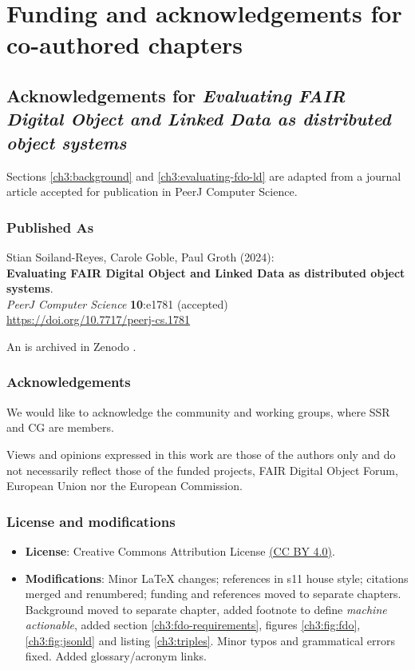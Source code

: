 \section{Funding and acknowledgements for co-authored chapters}


\subsection{Acknowledgements for \textit{Evaluating FAIR Digital Object and Linked Data as distributed object systems}}\label{ch11:fdo}

Sections \vref{ch3:background} and \vref{ch3:evaluating-fdo-ld} are adapted from a journal article accepted for publication in PeerJ Computer Science.

\subsubsection*{Published As}

Stian Soiland-Reyes, Carole Goble, Paul Groth (2024):\\
\textbf{Evaluating FAIR Digital Object and Linked Data as distributed object systems}.\\
\emph{PeerJ Computer Science} \textbf{10}:e1781 (accepted) \\
\url{https://doi.org/10.7717/peerj-cs.1781}

An  is archived in Zenodo \cite{Soiland-Reyes 2023a}.


\subsubsection*{Acknowledgements}

We would like to acknowledge the  community and working groups, where SSR and CG are members.

Views and opinions expressed in this work are those of the authors only and do not necessarily reflect those of the funded projects, FAIR Digital Object Forum, European Union nor the European Commission.

\subsubsection*{License and modifications}

\begin{itemize}
\tightlist
\item
  \textbf{License}: Creative Commons Attribution License
  \href{https://spdx.org/licenses/CC-BY-4.0}{(CC BY 4.0)}.
\item
  \textbf{Modifications}: Minor LaTeX changes; references in s11 house style; 
  citations merged and renumbered; 
  funding and references moved to separate chapters. Background moved to separate chapter, added footnote to define \emph{machine actionable}, added section \ref{ch3:fdo-requirements}, figures \ref{ch3:fig:fdo}, \ref{ch3:fig:jsonld} and listing \ref{ch3:triples}. Minor typos and grammatical errors fixed.  Added glossary/acronym links. 
\end{itemize}

